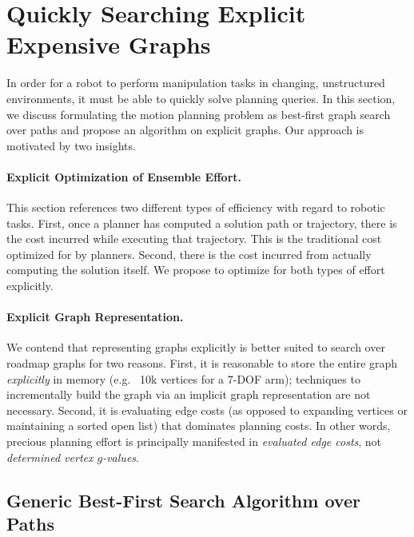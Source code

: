 \clearpage
\section{Quickly Searching Explicit Expensive Graphs}
\label{chap:e8}

In order for a robot to perform manipulation tasks
in changing, unstructured environments,
it must be able to quickly solve planning queries.
In this section,
we discuss formulating
the motion planning problem as best-first graph search over paths
and propose an algorithm on explicit graphs.
Our approach is motivated by two insights.

\paragraph{Explicit Optimization of Ensemble Effort.}
This section references two different types of efficiency
with regard to robotic tasks.
First, once a planner has computed a solution path or trajectory,
there is the cost incurred while executing that trajectory.
This is the traditional cost optimized for by planners.
Second, there is the cost incurred from actually computing the solution
itself.
We propose to optimize for both types of effort explicitly.

\paragraph{Explicit Graph Representation.}
We contend that representing graphs explicitly
is better suited to search over roadmap graphs
for two reasons.
First, it is reasonable to store the entire graph
\emph{explicitly} in memory
(e.g. ~10k vertices for a 7-DOF arm);
techniques to incrementally build the graph
via an implicit graph representation
are not necessary.
Second,
it is evaluating edge costs
(as opposed to expanding vertices or maintaining
a sorted open list)
that dominates planning costs.
In other words,
precious planning effort is principally manifested in
\emph{evaluated edge costs},
not \emph{determined vertex $g$-values}.

\subsection{Generic Best-First Search Algorithm over Paths}

